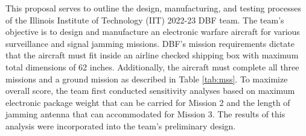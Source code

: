 
%
\par


This proposal serves to outline the design, manufacturing, and testing processes of the Illinois Institute of Technology (IIT) 2022-23 DBF team. The team's objective is to design and manufacture an electronic warfare aircraft for various surveillance and signal jamming missions. DBF's mission requirements dictate that the aircraft must fit inside an airline checked shipping box with maximum total dimensions of 62 inches. Additionally, the aircraft must complete all three missions and a ground mission as described in Table \ref{tab:mss}. To maximize overall score, the team first conducted sensitivity analyses based on maximum electronic package weight that can be carried for Mission 2 and the length of jamming antenna that can accommodated for Mission 3. The results of this analysis were incorporated into the team’s preliminary design.          


        
